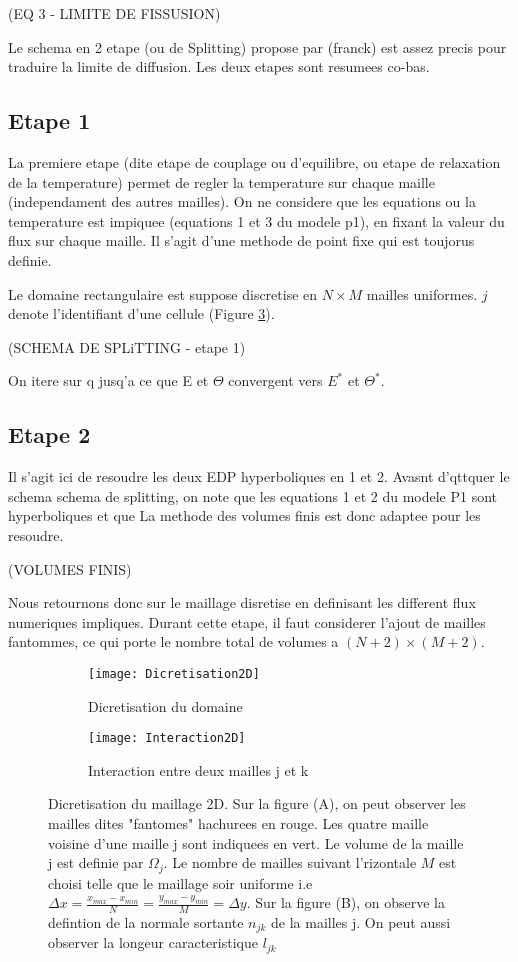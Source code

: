 (EQ 3 - LIMITE DE FISSUSION)

Le schema en 2 etape (ou de Splitting) propose par (franck) est assez precis pour traduire la limite de diffusion. Les deux etapes sont resumees co-bas.


\subsection{Etape 1}
La premiere etape (dite etape de couplage ou d'equilibre, ou etape de relaxation de la temperature) permet de regler la temperature sur chaque maille (independament des autres mailles). On ne considere que les equations ou la temperature est impiquee (equations 1 et 3 du modele p1), en fixant la valeur du flux sur chaque maille. Il s'agit d'une methode de point fixe qui est toujorus definie. \parencite{Reference2}

Le domaine rectangulaire est suppose discretise en $N \times M$ mailles uniformes. $j$ denote l'identifiant d'une cellule (Figure \ref{fig:2DMesh}).

(SCHEMA DE SPLiTTING - etape 1)

On itere sur q jusq'a ce que E et $\Theta$ convergent vers $E^*$ et $\Theta^*$.

\subsection{Etape 2}
Il s'agit ici de resoudre les deux EDP hyperboliques en 1 et 2. 
Avasnt d'qttquer le schema schema de splitting, on note que les equations 1 et 2 du modele P1 sont hyperboliques et que La methode des volumes finis est donc adaptee pour les resoudre.

(VOLUMES FINIS)

Nous retournons donc sur le maillage disretise en definisant les different flux numeriques impliques. Durant cette etape, il faut considerer l'ajout de mailles fantommes, ce qui porte le nombre total de volumes a $(N+2) \times (M+2)$.

\begin{figure}[H]
\begin{subfigure}{.6\textwidth}
  \centering
  \texttt{[image: Dicretisation2D]}  
  \caption{Dicretisation du domaine}
  \label{fig:Discretisation2D}
\end{subfigure}
\begin{subfigure}{.4\textwidth}
  \centering
  \texttt{[image: Interaction2D]}  
  \caption{Interaction entre deux mailles j et k}
  \label{fig:Interaction2D}
\end{subfigure}
\caption{Dicretisation du maillage 2D. Sur la figure (A), on peut observer les mailles dites "fantomes" hachurees en rouge. Les quatre maille voisine d'une maille j sont indiquees en vert. Le volume de la maille j est definie par $\Omega_j$. Le nombre de mailles suivant l'rizontale $M$ est choisi telle que le maillage soir uniforme i.e $\Delta x = \frac{x_{max}-x_{min}}{N} = \frac{y_{max}-y_{min}}{M} = \Delta y$. Sur la figure (B), on observe la defintion de la normale sortante $n_{jk}$ de la mailles j. On peut aussi observer la longeur caracteristique $l_{jk}$}
\label{fig:2DMesh}
\end{figure}

